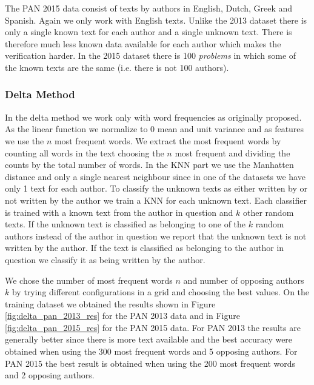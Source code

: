 The PAN 2015 data consist of texts by authors in English, Dutch, Greek and
Spanish. Again we only work with English texts. Unlike the 2013 dataset there is
only a single known text for each author and a single unknown text. There is
therefore much less known data available for each author which makes the
verification harder. In the 2015 dataset there is 100 \textit{problems} in which
some of the known texts are the same (i.e. there is not 100 authors).

\subsubsection{Delta Method}
In the delta method we work only with word frequencies as originally proposed.
As the linear function we normalize to 0 mean and unit variance and as features
we use the $n$ most frequent words. We extract the most frequent words by
counting all words in the text choosing the $n$ most frequent and dividing the
counts by the total number of words. In the \gls{KNN} part we use the Manhatten
distance and only a single nearest neighbour since in one of the datasets we
have only 1 text for each author. To classify the unknown texts as either
written by or not written by the author we train a \gls{KNN} for each unknown
text.  Each classifier is trained with a known text from the author in question
and $k$ other random texts. If the unknown text is classified as belonging
to one of the $k$ random authors instead of the author in question we report
that the unknown text is not written by the author. If the text is classified
as belonging to the author in question we classify it as being written by the
author.

We chose the number of most frequent words $n$ and number of opposing
authors $k$ by trying different configurations in a grid and choosing the
best values. On the training dataset we obtained the results shown in
Figure \ref{fig:delta_pan_2013_res} for the PAN 2013 data and in Figure
\ref{fig:delta_pan_2015_res} for the PAN 2015 data. For PAN 2013 the results are
generally better since there is more text available and the best accuracy were
obtained when using the 300 most frequent words and 5 opposing authors. For PAN
2015 the best result is obtained when using the 200 most frequent words and 2
opposing authors.

